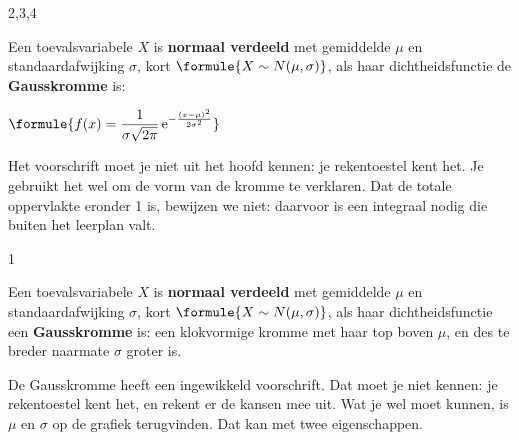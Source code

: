 \begin{alleenvoor}{2,3,4}
\begin{theorie}
Een toevalsvariabele $X$ is \textbf{\textcolor{accent}{normaal verdeeld}} met gemiddelde $\mu$ en standaardafwijking $\sigma$, kort $\formule{X \sim N(\mu, \sigma)}$, als haar dichtheidsfunctie de \textbf{\textcolor{accent}{Gausskromme}} is:

\vspace{1mm}
\qquad $\formule{f(x) = \dfrac{1}{\sigma\sqrt{2\pi}}\, \mathrm{e}^{-\frac{(x - \mu)^2}{2\sigma^2}}}$
\end{theorie}

Het voorschrift moet je niet uit het hoofd kennen: je rekentoestel kent het. Je gebruikt het wel om de vorm van de kromme te verklaren. Dat de totale oppervlakte eronder 1 is, bewijzen we niet: daarvoor is een integraal nodig die buiten het leerplan valt.
\end{alleenvoor}
\begin{alleenvoor}{1}
\begin{theorie}
Een toevalsvariabele $X$ is \textbf{\textcolor{accent}{normaal verdeeld}} met gemiddelde $\mu$ en standaardafwijking $\sigma$, kort $\formule{X \sim N(\mu, \sigma)}$, als haar dichtheidsfunctie een \textbf{\textcolor{accent}{Gausskromme}} is: een klokvormige kromme met haar top boven $\mu$, en des te breder naarmate $\sigma$ groter is.
\end{theorie}

De Gausskromme heeft een ingewikkeld voorschrift. Dat moet je niet kennen: je rekentoestel kent het, en rekent er de kansen mee uit. Wat je wel moet kunnen, is $\mu$ en $\sigma$ op de grafiek terugvinden. Dat kan met twee eigenschappen.
\end{alleenvoor}

